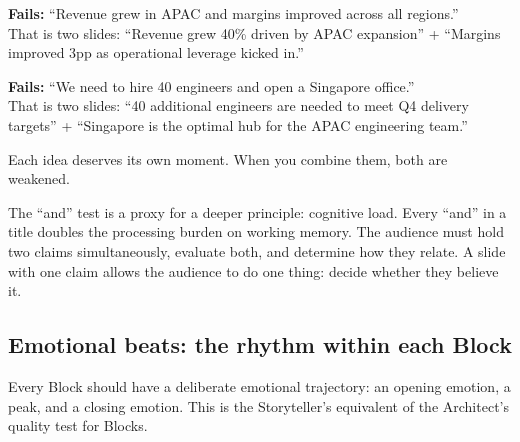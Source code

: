 \begin{alertbox}
\textbf{Fails:} ``Revenue grew in APAC and margins improved across all regions.''\\
That is two slides: ``Revenue grew 40\% driven by APAC expansion'' + ``Margins improved 3pp as operational leverage kicked in.''

\textbf{Fails:} ``We need to hire 40 engineers and open a Singapore office.''\\
That is two slides: ``40 additional engineers are needed to meet Q4 delivery targets'' + ``Singapore is the optimal hub for the APAC engineering team.''

Each idea deserves its own moment. When you combine them, both are weakened.
\end{alertbox}

The ``and'' test is a proxy for a deeper principle: cognitive load. Every ``and'' in a title doubles the processing burden on working memory. The audience must hold two claims simultaneously, evaluate both, and determine how they relate. A slide with one claim allows the audience to do one thing: decide whether they believe it.


\subsection{Emotional beats: the rhythm within each Block}

Every Block should have a deliberate emotional trajectory: an opening emotion, a peak, and a closing emotion. This is the Storyteller's equivalent of the Architect's quality test for Blocks.

